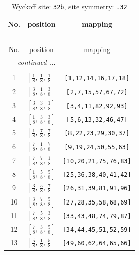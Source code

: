 \documentclass[fleqn,8pt]{jsarticle}
\begin{document}
\begin{longtable}{ccc}
\caption{Wyckoff site: {\tt 32b}, site symmetry: {\tt .32}}
 \\
 \hline \hline
No. & position & mapping \\ \hline \endfirsthead

\multicolumn{2}{l}{\tablename\ \thetable{}} \\
 \hline \hline
No. & position & mapping \\ \hline \endhead

 \hline \hline
\multicolumn{2}{r}{\footnotesize\it continued ...} \\ \endfoot

 \hline \hline
\multicolumn{2}{r}{} \\ \endlastfoot

1 & $\left[ \frac{1}{8},\, \frac{1}{8},\, \frac{1}{8} \right]$ & {\tt [1,12,14,16,17,18]} \\ \hline
2 & $\left[ \frac{3}{8},\, \frac{1}{8},\, \frac{3}{8} \right]$ & {\tt [2,7,15,57,67,72]} \\ \hline
3 & $\left[ \frac{3}{8},\, \frac{3}{8},\, \frac{1}{8} \right]$ & {\tt [3,4,11,82,92,93]} \\ \hline
4 & $\left[ \frac{1}{8},\, \frac{3}{8},\, \frac{3}{8} \right]$ & {\tt [5,6,13,32,46,47]} \\ \hline
5 & $\left[ \frac{1}{8},\, \frac{7}{8},\, \frac{7}{8} \right]$ & {\tt [8,22,23,29,30,37]} \\ \hline
6 & $\left[ \frac{7}{8},\, \frac{1}{8},\, \frac{7}{8} \right]$ & {\tt [9,19,24,50,55,63]} \\ \hline
7 & $\left[ \frac{7}{8},\, \frac{7}{8},\, \frac{1}{8} \right]$ & {\tt [10,20,21,75,76,83]} \\ \hline
8 & $\left[ \frac{1}{8},\, \frac{5}{8},\, \frac{5}{8} \right]$ & {\tt [25,36,38,40,41,42]} \\ \hline
9 & $\left[ \frac{3}{8},\, \frac{5}{8},\, \frac{7}{8} \right]$ & {\tt [26,31,39,81,91,96]} \\ \hline
10 & $\left[ \frac{3}{8},\, \frac{7}{8},\, \frac{5}{8} \right]$ & {\tt [27,28,35,58,68,69]} \\ \hline
11 & $\left[ \frac{7}{8},\, \frac{5}{8},\, \frac{3}{8} \right]$ & {\tt [33,43,48,74,79,87]} \\ \hline
12 & $\left[ \frac{7}{8},\, \frac{3}{8},\, \frac{5}{8} \right]$ & {\tt [34,44,45,51,52,59]} \\ \hline
13 & $\left[ \frac{5}{8},\, \frac{1}{8},\, \frac{5}{8} \right]$ & {\tt [49,60,62,64,65,66]} \\ \hline

\end{longtable}
\end{document}
